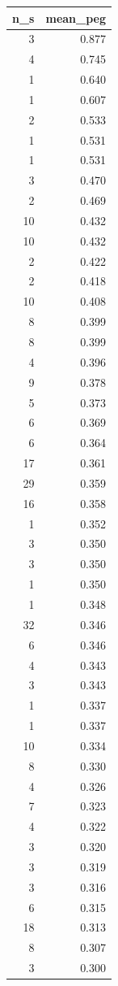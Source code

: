 \begin{tabular}{rr}
\toprule
n_s & mean_peg \\
\midrule
3 & 0.877 \\
4 & 0.745 \\
1 & 0.640 \\
1 & 0.607 \\
2 & 0.533 \\
1 & 0.531 \\
1 & 0.531 \\
3 & 0.470 \\
2 & 0.469 \\
10 & 0.432 \\
10 & 0.432 \\
2 & 0.422 \\
2 & 0.418 \\
10 & 0.408 \\
8 & 0.399 \\
8 & 0.399 \\
4 & 0.396 \\
9 & 0.378 \\
5 & 0.373 \\
6 & 0.369 \\
6 & 0.364 \\
17 & 0.361 \\
29 & 0.359 \\
16 & 0.358 \\
1 & 0.352 \\
3 & 0.350 \\
3 & 0.350 \\
1 & 0.350 \\
1 & 0.348 \\
32 & 0.346 \\
6 & 0.346 \\
4 & 0.343 \\
3 & 0.343 \\
1 & 0.337 \\
1 & 0.337 \\
10 & 0.334 \\
8 & 0.330 \\
4 & 0.326 \\
7 & 0.323 \\
4 & 0.322 \\
3 & 0.320 \\
3 & 0.319 \\
3 & 0.316 \\
6 & 0.315 \\
18 & 0.313 \\
8 & 0.307 \\
3 & 0.300 \\

\end{tabular}
